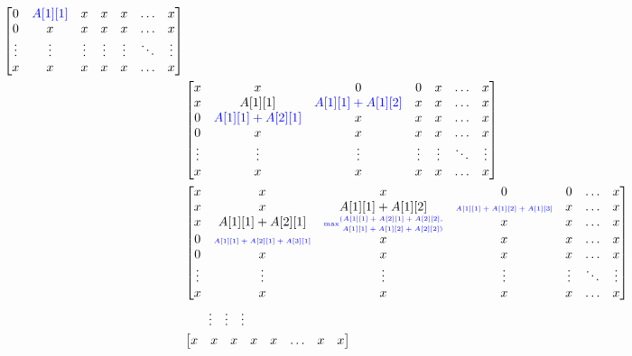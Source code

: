 \documentclass[a4paper]{article}
\begin{document}
\begin{enumerate}
\begin{enumerate}
\begin{align*}
\begin{bmatrix}
												0 & \text{\textcolor{blue}{$A[1][1]$}} & x & x & x & \hdots & x \\
												0 & x & x & x & x & \hdots & x \\
												\vdots&\vdots&\vdots&\vdots&\vdots&\ddots&\vdots\\
												x & x & x & x & x & \hdots & x \\
										\end{bmatrix} \\
										&
										\begin{bmatrix}
												x & x & 0 & 0 & x & \hdots & x \\
												x & A[1][1] & \text{\textcolor{blue}{$A[1][1] + A[1][2]$}} & x & x & \hdots & x \\
												0 & \text{\textcolor{blue}{$A[1][1] + A[2][1]$}} & x & x & x & \hdots & x \\
												0 & x & x & x & x & \hdots & x \\
												\vdots&\vdots&\vdots&\vdots&\vdots&\ddots&\vdots\\
												x & x & x & x & x & \hdots & x \\
										\end{bmatrix} \\
										&
										\begin{bmatrix}
												x & x & x & 0 & 0 &\hdots & x \\
												x & x & A[1][1] + A[1][2] & \text{\textcolor{blue}{{\tiny $A[1][1] + A[1][2] + A[1][3]$}}} & x & \hdots & x \\
												x & A[1][1] + A[2][1] & \text{\textcolor{blue}{{\tiny max\stackanchor{$(A[1][1] + A[2][1] + A[2][2], $}{ $ A[1][1] + A[1][2] + A[2][2])$}}}} & x & x & \hdots & x \\
												0 & \text{\textcolor{blue}{{\tiny $A[1][1] + A[2][1]+ A[3][1]$}}} & x & x & x & \hdots & x \\
												0 & x & x & x & x & \hdots & x \\
												\vdots&\vdots&\vdots&\vdots&\vdots&\ddots&\vdots\\
												x & x & x & x & x & \hdots & x \\
										\end{bmatrix} \\
										&\qquad \vdots \quad \vdots \quad \vdots \\
										&
										\begin{bmatrix}
												x & x & x & x & x & \hdots & x & x\\

\end{bmatrix}
\end{align*}
\end{enumerate}
\end{enumerate}
\end{document}
